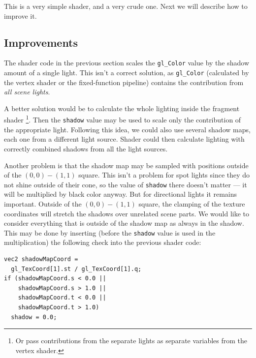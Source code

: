 \documentclass{acmsiggraph}                     %
\newenvironment{mycode}
{\begin{mycodecore}}
{\end{mycodecore}
\vspace{-0.1in}}
\newcommand*{\myhref}[2]{\texttt{\href{#1}{\nolinkurl{#2}}}}
\begin{document}
This is a very simple shader, and a very crude one. Next we will
describe how to improve it.

\subsection{Improvements}

The shader code in the previous section scales the \texttt{gl\_Color}
value by the shadow amount of a single light. This isn't a correct solution,
as \texttt{gl\_Color} (calculated by the vertex shader or the fixed-function pipeline)
contains the contribution from \emph{all scene lights}.

A better solution would be to calculate the whole lighting inside
the fragment shader
\footnote{Or pass contributions from the separate
lights as separate variables from the vertex shader.}.
Then the \texttt{shadow} value may be used to scale only
the contribution of the appropriate light.
Following this idea, we could also use several shadow maps,
each one from a different light source.
Shader could then calculate lighting with correctly combined shadows
from all the light sources.

Another problem is that the shadow map may be sampled
with positions outside of the $(0, 0) - (1, 1)$ square. This isn't
a problem for spot lights since they do not shine outside of their
cone, so the value of \texttt{shadow} there doesn't matter --- it will
be multiplied by black color anyway. But for directional lights it remains
important. Outside of the $(0, 0) - (1, 1)$ square,
the clamping of the texture coordinates will stretch the shadows over
unrelated scene parts.
We would like to consider everything that is outside of the shadow map
as always in the shadow. This may be done by inserting
(before the \texttt{shadow} value is used in the multiplication)
the following check into the previous shader code:

\begin{mycode}
\begin{Verbatim}
vec2 shadowMapCoord =
  gl_TexCoord[1].st / gl_TexCoord[1].q;
if (shadowMapCoord.s < 0.0 ||
    shadowMapCoord.s > 1.0 ||
    shadowMapCoord.t < 0.0 ||
    shadowMapCoord.t > 1.0)
  shadow = 0.0;
\end{Verbatim}
\end{mycode}

\end{document}
